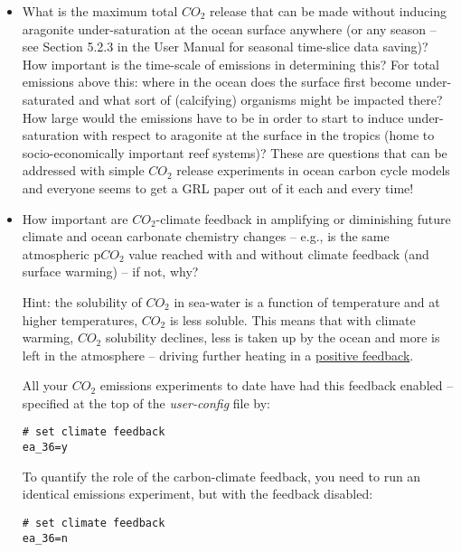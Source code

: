 \begin{itemize}[noitemsep]

\vspace{1mm}
\item What is the maximum total \(CO_{2}\) release that can be made without inducing aragonite under-saturation at the ocean surface anywhere (or any season – see Section 5.2.3 in the User Manual for seasonal time-slice data saving)? How important is the time-scale of emissions in determining this? For total emissions above this: where in the ocean does the surface first become under-saturated and what sort of (calcifying) organisms might be impacted there? How large would the emissions have to be in order to start to induce under-saturation with respect to aragonite at the surface in the tropics (home to socio-economically important reef systems)? These are questions that can be addressed with simple \(CO_{2}\) release experiments in ocean carbon cycle models and everyone seems to get a GRL paper out of it each and every time!

\vspace{1mm}
\item How important are \(CO_{2}\)-climate feedback in amplifying or diminishing future climate and ocean carbonate chemistry changes – e.g., is the same atmospheric p\(CO_{2}\) value reached with and without climate feedback (and surface warming) – if not, why? 

Hint: the solubility of \(CO_{2}\) in sea-water is a function of temperature and at higher temperatures, \(CO_{2}\) is less soluble. This means that with climate warming, \(CO_{2}\) solubility declines, less is taken up by the ocean and more is left in the atmosphere -- driving further heating in a \uline{positive feedback}.

\vspace{1mm}

All your \(CO_{2}\) emissions experiments to date have had this feedback enabled -- specified at the top of the \textit{user-config} file by:
\vspace{-2pt}\small\begin{verbatim}
# set climate feedback
ea_36=y
\end{verbatim}\normalsize\vspace{-2pt}

To quantify the role of the carbon-climate feedback, you need to run an identical emissions experiment, but with the feedback disabled:
\vspace{-2pt}\small\begin{verbatim}
# set climate feedback
ea_36=n
\end{verbatim}\normalsize\vspace{-2pt}


\end{itemize}
